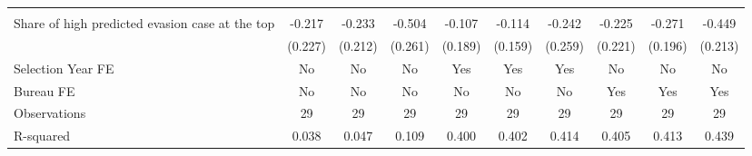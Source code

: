 \begin{tabular}{l*{9}{c}}
\addlinespace \midrule \multicolumn{10}{l}{\textbf{Panel B: Continuous measure}}\\ \addlinespace

Share of high predicted evasion case at the top&      -0.217         &      -0.233         &      -0.504\sym{*}  &      -0.107         &      -0.114         &      -0.242         &      -0.225         &      -0.271         &      -0.449\sym{*}  \\
            &     (0.227)         &     (0.212)         &     (0.261)         &     (0.189)         &     (0.159)         &     (0.259)         &     (0.221)         &     (0.196)         &     (0.213)         \\
\midrule
Selection Year FE&          No         &          No         &          No         &         Yes         &         Yes         &         Yes         &          No         &          No         &          No         \\
Bureau FE   &          No         &          No         &          No         &          No         &          No         &          No         &         Yes         &         Yes         &         Yes         \\
Observations&          29         &          29         &          29         &          29         &          29         &          29         &          29         &          29         &          29         \\
R-squared   &       0.038         &       0.047         &       0.109         &       0.400         &       0.402         &       0.414         &       0.405         &       0.413         &       0.439         \\
\bottomrule \end{tabular}
